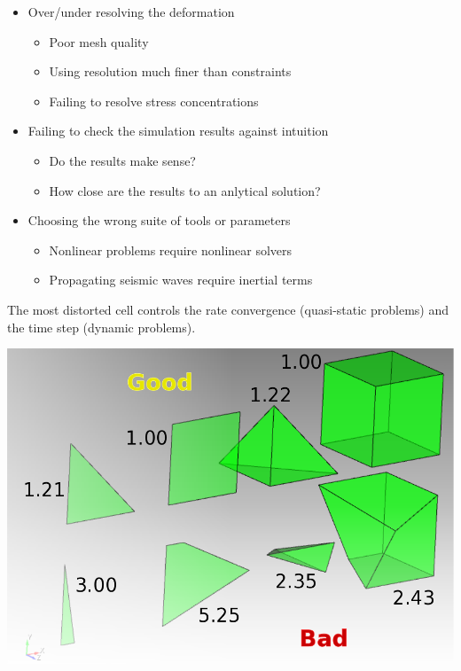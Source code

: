 \documentclass[pdftex,cig,slideColor]{pp4slides}
\begin{document}
  
  \summary{}

  \begin{itemize}
  \item Over/under resolving the deformation
    \begin{itemize}
    \item Poor mesh quality
    \item Using resolution much finer than constraints
    \item Failing to resolve stress concentrations
    \end{itemize}
  \item Failing to check the simulation results against intuition
    \begin{itemize}
    \item Do the results make sense?
    \item How close are the results to an anlytical solution?
    \end{itemize}
  \item Choosing the wrong suite of tools or parameters
    \begin{itemize}
    \item Nonlinear problems require nonlinear solvers
    \item Propagating seismic waves require inertial terms
    \end{itemize}
  \end{itemize}


  \vfill 
  The most distorted cell controls the rate convergence
  (quasi-static problems) and the time step (dynamic problems).
  \vfill

  \begin{center}
    \includegraphics[scale=0.5]{figs/cells_distorted}
 \end{center}
  \vfill
\end{document}
